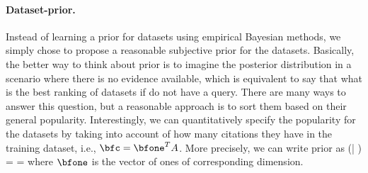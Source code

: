 \documentclass{amia}
\begin{document}
\paragraph{Dataset-prior.} Instead of learning a prior for datasets using empirical Bayesian methods, we simply chose to propose a reasonable subjective prior for the datasets. Basically, the better way to think about prior is to imagine the posterior distribution in a scenario where there is no evidence available, which is equivalent to say that what is the best ranking of datasets if do not have a query. There are many ways to answer this question, but a reasonable approach is to sort them based on their general popularity. Interestingly, we can quantitatively specify the popularity for the datasets by taking into account of how many citations they have in the training dataset, i.e., $\bfc=\bfone^TA$. More precisely, we can write prior as
\beq \label{eq:prior}
\pr(\bfy | \bfc ) =  = 
\eeq
where $\bfone$ is the vector of ones of corresponding dimension.
\end{document}
